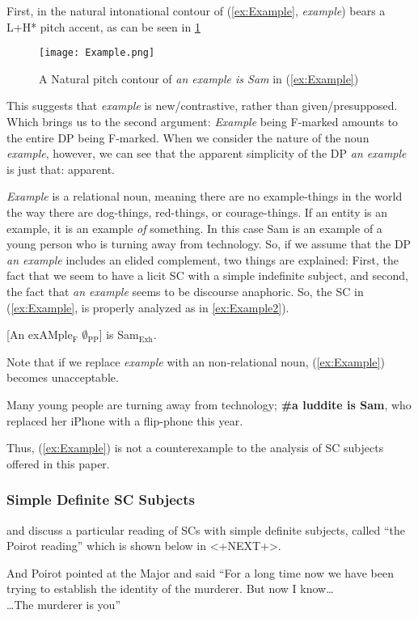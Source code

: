 \documentclass[
	letterpaper,
]{article}
\begin{document}
First, in the natural intonational contour of (\ref{ex:Example}, \textit{example}) bears a L+H* pitch accent, as can be seen in \ref{fig:Example}
\begin{figure}[h]
	\centering
	\texttt{[image: Example.png]}
	\caption{A Natural pitch contour of \textit{an example is Sam} in (\ref{ex:Example})}
	\label{fig:Example}
\end{figure}
This suggests that \textit{example} is new/contrastive, rather than given/presupposed.
Which brings us to the second argument: \textit{Example} being F-marked amounts to the entire DP being F-marked.
When we consider the nature of the noun \textit{example}, however, we can see that the apparent simplicity of the DP \textit{an example} is just that: apparent.

\textit{Example} is a relational noun, meaning there are no example-things in the world the way there are dog-things, red-things, or courage-things.
If an entity is an example, it is an example \textit{of} something.
In this case Sam is an example of a young person who is turning away from technology.
So, if we assume that the DP \textit{an example} includes an elided complement, two things are explained:
First, the fact that we seem to have a licit SC with a simple indefinite subject, and second, the fact that \textit{an example} seems to be discourse anaphoric.
So, the SC in (\ref{ex:Example}, is properly analyzed as in \ref{ex:Example2}).
\begin{exe}	
	\ex \label{ex:Example2} [An exAMple$_\text{F}$ $\emptyset_\text{PP}$] is Sam$_\text{Exh}$.
\end{exe}

Note that if we replace \textit{example} with an non-relational noun, (\ref{ex:Example}) becomes unacceptable.
\begin{exe}
	\ex\label{ex:Luddite} Many young people are turning away from technology; \textbf{\#a luddite is Sam}, who replaced her iPhone with a flip-phone this year.
\end{exe}
Thus, (\ref{ex:Example}) is not a counterexample to the analysis of SC subjects offered in this paper.
\subsubsection{Simple Definite SC Subjects}

\textcite{heycock2010variability} and \textcite{bejarkahnemuyipour2013agreement} discuss a particular reading of SCs with simple definite subjects, called ``the Poirot reading'' which is shown below in <+NEXT+>.
\begin{exe}
\ex And Poirot pointed at the Major and said ``For a long time now we have been trying to establish the identity of the murderer. But now I know\ldots\\
\ldots The murderer is you''	
\end{exe}
\end{document}
